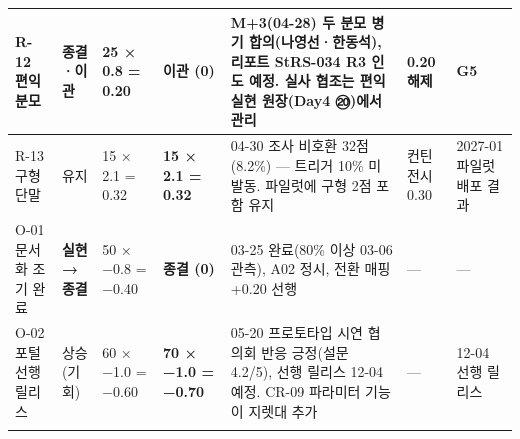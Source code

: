 \documentclass[10pt,a4paper]{article}
\begin{document}
{\begin{longtable}{|L{20mm}|L{30mm}|L{30mm}|L{24mm}|L{88mm}|L{28mm}|L{32mm}|}
R-12 편익 분모 & \textbf{종결·이관} & 25 × 0.8 = 0.20 & \textbf{이관 (0)} & M+3(04-28) 두 분모 병기 합의(나영선·한동석), 리포트 StRS-034 R3 인도 예정. 실사 협조는 편익 실현 원장(Day4 ⑳)에서 관리 & 0.20 해제 & G5 \\ \hline
R-13 구형 단말 & 유지 & 15 × 2.1 = 0.32 & \textbf{15 × 2.1 = 0.32} & 04-30 조사 비호환 32점(8.2\%) — 트리거 10\% 미발동. 파일럿에 구형 2점 포함 유지 & 컨틴전시 0.30 & 2027-01 파일럿 배포 결과 \\ \hline
O-01 문서화 조기 완료 & \textbf{실현 → 종결} & 50 × −0.8 = −0.40 & \textbf{종결 (0)} & 03-25 완료(80\% 이상 03-06 관측), A02 정시, 전환 매핑 +0.20 선행 & — & — \\ \hline
O-02 포털 선행 릴리스 & 상승(기회) & 60 × −1.0 = −0.60 & \textbf{70 × −1.0 = −0.70} & 05-20 프로토타입 시연 협의회 반응 긍정(설문 4.2/5), 선행 릴리스 12-04 예정. CR-09 파라미터 기능이 지렛대 추가 & — & 12-04 선행 릴리스 \\ \hline
\fi
\end{longtable}}
\end{document}
